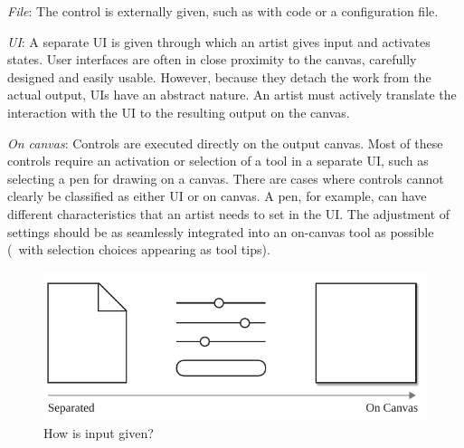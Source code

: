 \textit{File}: The control is externally given, such as with code or a configuration file.

\textit{UI}: A separate UI is given through which an artist gives input and activates states. User interfaces are often in close proximity to the canvas, carefully designed and easily usable. However, because they detach the work from the actual output, UIs have an abstract nature. An artist must actively translate the interaction with the UI to the resulting output on the canvas.

\textit{On canvas}: Controls are executed directly on the output canvas. Most of these controls require an activation or selection of a tool in a separate UI, such as selecting a pen for drawing on a canvas. 
There are cases where controls cannot clearly be classified as either UI or on canvas. A pen, for example, can have different characteristics that an artist needs to set in the UI. The adjustment of settings should be as seamlessly integrated into an on-canvas tool as possible (\eg~with selection choices appearing as tool tips). 

\begin{figure}[hbt]
    \centering
        \includegraphics[width=\controlParamsFigWidth\linewidth]{figures/control_paradigms/how.pdf}
    \caption{How is input given?}
\end{figure}



